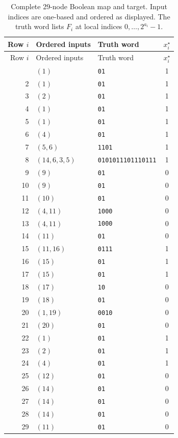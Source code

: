 \begin{longtable}{r l l c}
\caption{Complete 29-node Boolean map and target. Input indices are one-based and ordered as displayed. The truth word lists $F_i$ at local indices $0,\ldots,2^{a_i}-1$.}\label{tab:rules29}\\
\toprule Row $i$ & Ordered inputs & Truth word & $x_i^\star$\\\midrule\endfirsthead
\toprule Row $i$ & Ordered inputs & Truth word & $x_i^\star$\\\midrule\endhead
\bottomrule\endfoot
1 & $(1)$ & \texttt{01} & 1\\
2 & $(1)$ & \texttt{01} & 1\\
3 & $(2)$ & \texttt{01} & 1\\
4 & $(1)$ & \texttt{01} & 1\\
5 & $(1)$ & \texttt{01} & 1\\
6 & $(4)$ & \texttt{01} & 1\\
7 & $(5,6)$ & \texttt{1101} & 1\\
8 & $(14,6,3,5)$ & \texttt{0101011101110111} & 1\\
9 & $(9)$ & \texttt{01} & 0\\
10 & $(9)$ & \texttt{01} & 0\\
11 & $(10)$ & \texttt{01} & 0\\
12 & $(4,11)$ & \texttt{1000} & 0\\
13 & $(4,11)$ & \texttt{1000} & 0\\
14 & $(11)$ & \texttt{01} & 0\\
15 & $(11,16)$ & \texttt{0111} & 1\\
16 & $(15)$ & \texttt{01} & 1\\
17 & $(15)$ & \texttt{01} & 1\\
18 & $(17)$ & \texttt{10} & 0\\
19 & $(18)$ & \texttt{01} & 0\\
20 & $(1,19)$ & \texttt{0010} & 0\\
21 & $(20)$ & \texttt{01} & 0\\
22 & $(1)$ & \texttt{01} & 1\\
23 & $(2)$ & \texttt{01} & 1\\
24 & $(4)$ & \texttt{01} & 1\\
25 & $(12)$ & \texttt{01} & 0\\
26 & $(14)$ & \texttt{01} & 0\\
27 & $(14)$ & \texttt{01} & 0\\
28 & $(14)$ & \texttt{01} & 0\\
29 & $(11)$ & \texttt{01} & 0\\
\end{longtable}


